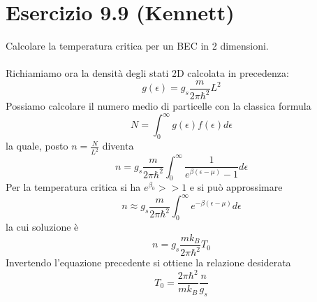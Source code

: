 \documentclass[a4paper]{article}
\begin{document}
    \section*{Esercizio 9.9 (Kennett)}
        Calcolare la temperatura critica per un BEC in 2 dimensioni.
        \\
        \\
        Richiamiamo ora la densità degli stati 2D calcolata in precedenza:
        \begin{equation*}
            g(\epsilon)=g_s\frac{m}{2\pi\hbar^2}L^2
        \end{equation*}
        Possiamo calcolare il numero medio di particelle con la classica formula
        \begin{equation*}
            N=\int_0^\infty g(\epsilon)f(\epsilon)d\epsilon
        \end{equation*}
        la quale, posto $n=\frac{N}{L^2}$ diventa
        \begin{equation*}
            n=g_s\frac{m}{2\pi\hbar^2}\int_0^\infty \frac{1}{e^{\beta(\epsilon-\mu)}-1}d\epsilon
        \end{equation*}
        Per la temperatura critica si ha $e^{\beta_0}>>1$ e si può approssimare
        \begin{equation*}
            n\approx g_s\frac{m}{2\pi\hbar^2}\int_0^\infty e^{-\beta(\epsilon-\mu)}d\epsilon
        \end{equation*}
        la cui soluzione è
        \begin{equation*}
            n=g_s\frac{mk_B}{2\pi\hbar^2}T_0
        \end{equation*}
        Invertendo l'equazione precedente si ottiene la relazione desiderata
        \begin{equation*}
            T_0=\frac{2\pi\hbar^2}{mk_B}\frac{n}{g_s}
        \end{equation*}
\end{document}
